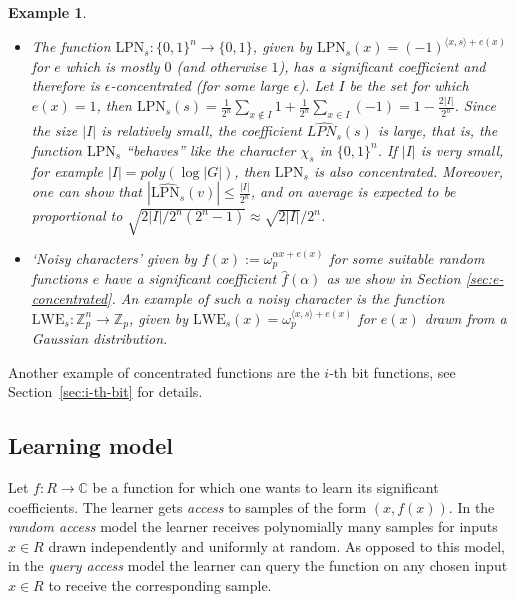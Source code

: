 \documentclass[11pt]{article}
\newtheorem{example}[theorem]{Example}
\theoremstyle{definition}
\newcommand{\Z}{\mathbb{Z}}
\newcommand{\C}{\mathbb{C}}
\begin{document}
\begin{example}
\begin{itemize}
        \item The function $\text{LPN}_s: \{0,1\}^n \to \{0,1\}$, given by $\text{LPN}_s(x) = (-1)^{\langle x,s \rangle + e(x)}$ for $e$ which is mostly $0$ (and otherwise $1$), has a significant coefficient and therefore is $\epsilon$-concentrated (for some large $\epsilon$).
              Let $I$ be the set for which $e(x) = 1$, then $\widehat{\text{LPN}_s}(s) = \frac{1}{2^n} \sum_{x \notin I} 1 + \frac{1}{2^n} \sum_{x \in I} (-1) = 1 - \frac{2|I|}{2^n}$. Since the size $|I|$ is relatively small, the coefficient $\widehat{LPN_s}(s)$ is large, that is, the function $\text{LPN}_s$ ``behaves'' like the character $\chi_s$ in $\{0,1\}^n$. If $|I|$ is very small, for example $|I|=poly(\log|G|)$, then $\text{LPN}_s$ is also concentrated. Moreover, one can show that $|\widehat{\text{LPN}_s}(v)| \le \tfrac{|I|}{2^n}$, and on average is expected to be proportional to $\sqrt{2|I|/ 2^n(2^n-1)} \approx \sqrt{2|I|}/2^n$.


        \item `Noisy characters' given by $f(x):=\omega_p^{\alpha x+e(x)}$ for some suitable random functions $e$ have a significant coefficient $\widehat{f}(\alpha)$ as we show in Section \ref{sec:e-concentrated}. An example of such a noisy character is the function $\text{LWE}_s: \Z_p^n \to \Z_p$, given by $\text{LWE}_s(x) = \omega_p^{\langle x,s \rangle + e(x)}$ for $e(x)$ drawn from a Gaussian distribution.
    \end{itemize}
\end{example}

Another example of concentrated functions are the $i$-th bit functions, see Section~\ref{sec:i-th-bit} for details.

\subsection{Learning model}

Let $f: R \to \C$ be a function for which one wants to learn its significant coefficients.
The learner gets \emph{access} to samples of the form $(x, f(x))$. In the \emph{random access} model the learner receives polynomially many samples for inputs $x \in R$ drawn independently and uniformly at random. As opposed to this model, in the \emph{query access} model the learner can query the function on any chosen input $x \in R$ to receive the corresponding sample.
\end{document}
